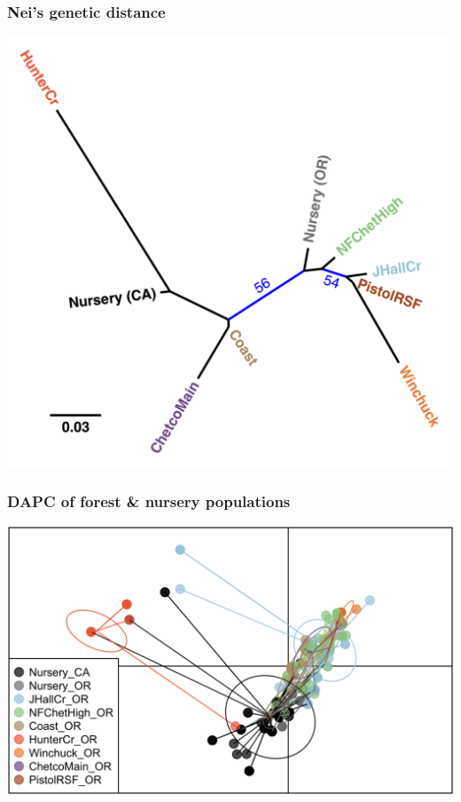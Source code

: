 \documentclass{beamer}\usepackage[]{graphicx}\usepackage[]{color}
\begin{document}
\begin{frame}[allowpagebreak,T]
	\frametitle{Nei's genetic distance}
	\centering
	\includegraphics[keepaspectratio, height=0.9\paperheight]{../neitree.png}
\end{frame}


\begin{frame}[allowpagebreak,T]
	\frametitle{DAPC of forest \& nursery populations}
	\centering
	\includegraphics[keepaspectratio, width=0.85\paperwidth]{../DAPC_nursery.png}
\end{frame}
\end{document}
